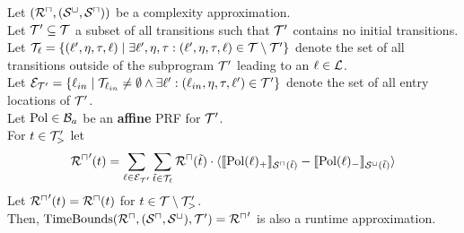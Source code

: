 \begin{theorem}[TimeBounds]
  Let $({\mathcal{R}^\sqcap}, {({\mathcal{S}^\sqcup}, {\mathcal{S}^\sqcap})})$ be a complexity approximation. \\
  Let $\mathcal{T}' \subseteq \mathcal{T}$ a subset of all transitions such that $\mathcal{T}'$ contains no initial transitions. \\
  Let $\mathcal{T}_{\ell} = \lbrace (\ell', \eta, \tau, \ell) \mid \exists \ell', \eta, \tau: (\ell', \eta, \tau, \ell) \in \mathcal{T} \setminus \mathcal{T}' \rbrace$ denote the set of all transitions outside of the subprogram $\mathcal{T}'$ leading to an $\ell \in \mathcal{L}$. \\
  Let $\mathcal{E}_{\mathcal{T}'} = \lbrace \ell_{in} \mid \mathcal{T}_{\ell_{in}} \neq \emptyset \wedge \exists \ell': (\ell_{in}, \eta, \tau, \ell') \in \mathcal{T}' \rbrace$ denote the set of all entry locations of $\mathcal{T}'$. \\
  Let $\text{Pol} \in \mathcal{B}_a$ be an \textbf{affine} PRF for $\mathcal{T}'$. \\
  For $t \in \mathcal{T}'_>$ let
  \[ {\mathcal{R}^\sqcap}'(t) = \sum_{\ell \in \mathcal{E}_{\mathcal{T}'}} \sum_{\tilde{t} \in \mathcal{T}_\ell} {\mathcal{R}^\sqcap}(\tilde{t}) \cdot \langle\llbracket \text{Pol}(\ell)_+ \rrbracket_{{\mathcal{S}^\sqcap}(\tilde{t})} - \llbracket \text{Pol}(\ell)_- \rrbracket_{{\mathcal{S}^\sqcup}(\tilde{t})}\rangle \]
  Let ${\mathcal{R}^\sqcap}'(t) = {\mathcal{R}^\sqcap}(t)$ for $t \in \mathcal{T} \setminus \mathcal{T}'_>$. \\
  Then, $\text{TimeBounds}({\mathcal{R}^\sqcap}, ({\mathcal{S}^\sqcap}, {\mathcal{S}^\sqcup}), \mathcal{T}') = {\mathcal{R}^\sqcap}'$ is also a runtime approximation.
\end{theorem}
